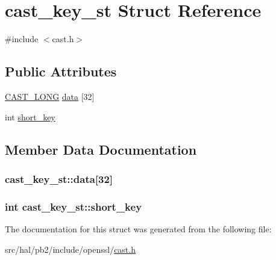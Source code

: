 \hypertarget{structcast__key__st}{}\section{cast\+\_\+key\+\_\+st Struct Reference}
\label{structcast__key__st}


{\ttfamily \#include $<$cast.\+h$>$}

\subsection*{Public Attributes}
\begin{DoxyCompactItemize}
\item 
\hyperlink{cast_8h_a5f536ad3c10c7a7a51cdb6c75e8ae165}{C\+A\+S\+T\+\_\+\+L\+O\+NG} \hyperlink{structcast__key__st_a016e1aa6521740a3a438bc04b2c78014}{data} \mbox{[}32\mbox{]}
\item 
int \hyperlink{structcast__key__st_a34043464743188eea278cc583540db15}{short\+\_\+key}
\end{DoxyCompactItemize}


\subsection{Member Data Documentation}
\subsubsection[{\texorpdfstring{data}{data}}]{ cast\+\_\+key\+\_\+st\+::data\mbox{[}32\mbox{]}}\hypertarget{structcast__key__st_a016e1aa6521740a3a438bc04b2c78014}{}\label{structcast__key__st_a016e1aa6521740a3a438bc04b2c78014}
\subsubsection[{\texorpdfstring{short\+\_\+key}{short_key}}]{\setlength{\rightskip}{0pt plus 5cm}int cast\+\_\+key\+\_\+st\+::short\+\_\+key}\hypertarget{structcast__key__st_a34043464743188eea278cc583540db15}{}\label{structcast__key__st_a34043464743188eea278cc583540db15}


The documentation for this struct was generated from the following file\+:\begin{DoxyCompactItemize}
\item 
src/hal/pb2/include/openssl/\hyperlink{cast_8h}{cast.\+h}\end{DoxyCompactItemize}
